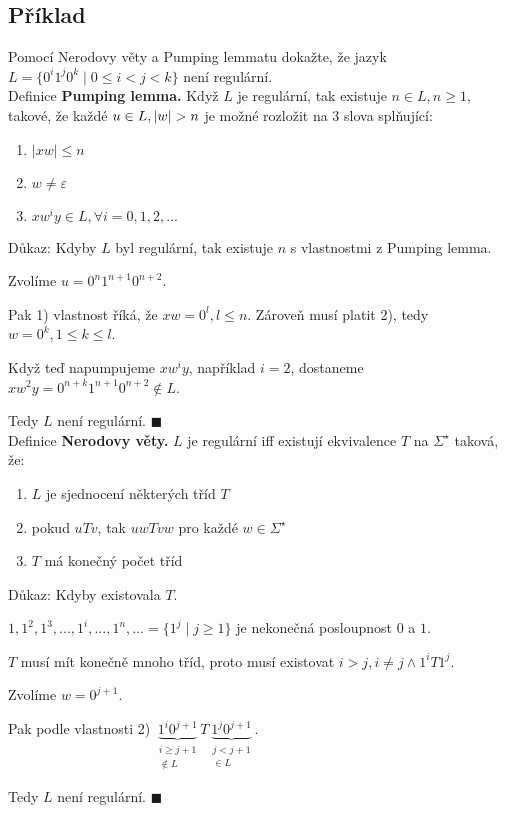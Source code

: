 \newpage %
\subsection{Příklad}
Pomocí Nerodovy věty a Pumping lemmatu dokažte, že jazyk $L = \{0^i 1^j 0^k \mid 0 \leq i < j <k\}$ není regulární.\\

\noindent
Definice \textbf{Pumping lemma.} Když $L$ je regulární, tak existuje $n \in L, n \geq 1$, takové, že každé ${u \in L},\\
|w| > n$ je 
možné rozložit na 3 slova splňující:
\begin{enumerate}[1), noitemsep]
    \item $|xw| \leq n$
    \item $w \not= \varepsilon$
    \item $xw^i y \in L, \forall i = 0, 1, 2, ...$
\end{enumerate}
Důkaz:
Kdyby $L$ byl regulární, tak existuje $n$ s vlastnostmi z Pumping lemma.

Zvolíme $u = 0^n 1^{n+1} 0^{n+2}$.

Pak 1) vlastnost říká, že $xw = 0^l, l \leq n$. Zároveň musí platit 2), tedy $w = 0^k, 1 \leq k \leq l$.

Když teď napumpujeme $xw^i y$, například $i=2$, dostaneme $xw^2 y = 0^{n+k} 1^{n+1} 0^{n+2} \not\in L$.

Tedy $L$ není regulární. $\blacksquare$\\

\noindent
Definice \textbf{Nerodovy věty.} $L$ je regulární iff existují ekvivalence $T$ na $\Sigma^\star$ taková, že:
\begin{enumerate}[1), noitemsep]
    \item $L$ je sjednocení některých tříd $T$
    \item pokud $uTv$, tak $uwTvw$ pro každé $w \in \Sigma^\star$
    \item $T$ má konečný počet tříd
\end{enumerate}
Důkaz:
Kdyby existovala $T$.

$1, 1^2, 1^3, ..., 1^i, ..., 1^n, ... = \{1^j \mid j \geq 1\}$ je nekonečná posloupnost $0$ a $1$. 

$T$ musí mít konečně mnoho tříd, proto musí existovat $i > j, i \not= j \land 1^i T 1^j$.

Zvolíme $w = 0^{j + 1}$.

Pak podle vlastnosti 2) $\underbrace{1^i 0^{j+1}}_{\substack{i \geq j+1 \\ \not\in L}} T 
\underbrace{1^j 0^{j+1}}_{\substack{j < j+1 \\\in L }}$.

Tedy $L$ není regulární. $\blacksquare$